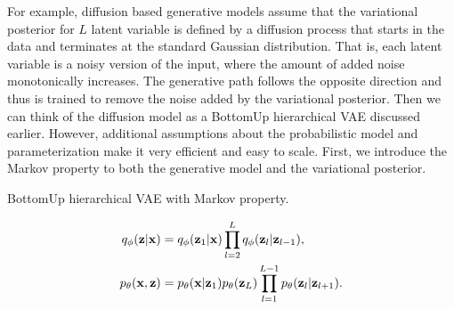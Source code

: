For example, diffusion based generative models assume that the variational posterior for $L$ latent variable is defined by a diffusion process that starts in the data and terminates at the standard Gaussian distribution. 
That is, each latent variable is a noisy version of the input, where the amount of added noise monotonically increases. 
The generative path follows the opposite direction and thus is trained to remove the noise added by the variational posterior. 
Then we can think of the diffusion model as a BottomUp hierarchical VAE discussed earlier. 
However, additional assumptions about the probabilistic model and parameterization make it very efficient and easy to scale. 
First, we introduce the Markov property to both the generative model and the variational posterior.
\begin{marginfigure}
\quad\quad
  \quad\quad\quad
\caption{BottomUp hierarchical VAE with Markov property.}\label{fig:intro_diff_schema}
\end{marginfigure}
\begin{align}
    q_{\phi}({\mathbf{z}}|{\mathbf{x}}) &= q_{\phi}({\mathbf{z}}_1|{\mathbf{x}})\prod_{l=2}^L q_{\phi}({\mathbf{z}}_l|{\mathbf{z}}_{l-1}), \\
    p_{\theta}({\mathbf{x}}, {\mathbf{z}}) &= p_{\theta}({\mathbf{x}} |{\mathbf{z}}_1) p_{\theta}({\mathbf{z}}_L)\prod_{l=1}^{L-1} p_{\theta}({\mathbf{z}}_l|{\mathbf{z}}_{l+1}).
\end{align}
